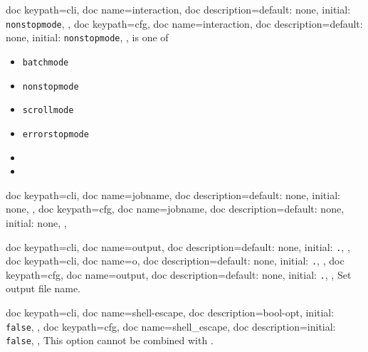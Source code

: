 \documentclass[a4paper, 11pt]{scrartcl}
\begin{document}
\begin{docKeys}[
		doc parameter={=\meta{interaction}},
	]{
		{
			doc keypath=cli,
			doc name=interaction,
			doc description={default: none, initial: \texttt{nonstopmode}},
		},
		{
			doc keypath=cfg,
			doc name=interaction,
			doc description={default: none, initial: \texttt{nonstopmode}},
		},
	}
	 is one of
	\begin{multicols}{3}
		\begin{itemize}
			\item \texttt{batchmode}
			\item \texttt{nonstopmode}
			\item \texttt{scrollmode}
			\item \texttt{errorstopmode}
			\item[]
			\item[]
		\end{itemize}
	\end{multicols}
\end{docKeys}
\begin{docKeys}[
		doc parameter={=\meta{jobname}},
	]{
		{
			doc keypath=cli,
			doc name=jobname,
			doc description={default: none, initial: none},
		},
		{
			doc keypath=cfg,
			doc name=jobname,
			doc description={default: none, initial: none},
		},
	}
\end{docKeys}
\begin{docKeys}[
		doc parameter={=\meta{output}},
	]{
		{
			doc keypath=cli,
			doc name=output,
			doc description={default: none, initial: \texttt{.}},
		},
		{
			doc keypath=cli,
			doc name=o,
			doc description={default: none, initial: \texttt{.}},
		},
		{
			doc keypath=cfg,
			doc name=output,
			doc description={default: none, initial: \texttt{.}},
		},
	}
	Set output file name.
\end{docKeys}
\begin{docKeys}[
	]{
		{
			doc keypath=cli,
			doc name=shell-escape,
			doc description={bool-opt, initial: \texttt{false}},
		},
		{
			doc keypath=cfg,
			doc name=shell_escape,
			doc description={initial: \texttt{false}},
		},
	}
	This option cannot be combined with .
\end{docKeys}
\end{document}
